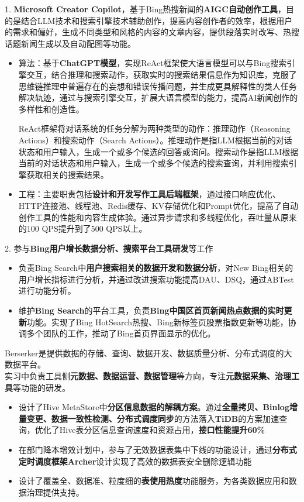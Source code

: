 \documentclass{resume}
\begin{document}
  1. \textbf{Microsoft Creator Copilot}，基于Bing热搜新闻的\textbf{AIGC自动创作工具}，目的是结合LLM技术和搜索引擎技术辅助创作，提高内容创作者的效率，根据用户的需求和偏好，生成不同类型和风格的内容的文章内容，提供段落实时改写、热搜话题新闻生成以及自动配图等功能。
  \begin{itemize}
    \item 算法：基于\textbf{ChatGPT模型}，实现ReAct框架使大语言模型可以与Bing搜索引擎交互，结合推理和搜索动作，获取实时的搜索结果信息作为知识库，克服了思维链推理中普遍存在的妄想和错误传播问题，并生成更具解释性的类人任务解决轨迹，通过与搜索引擎交互，扩展大语言模型的能力，提高AI新闻创作的多样性和创造性。
    
    ReAct框架将对话系统的任务分解为两种类型的动作：推理动作（Reasoning Actions）和搜索动作（Search Actions）。推理动作是指LLM根据当前的对话状态和用户输入，生成一个或多个候选的回答或询问。搜索动作是指LLM根据当前的对话状态和用户输入，生成一个或多个候选的搜索查询，并利用搜索引擎获取相关的搜索结果。
    \item 工程：主要职责包括\textbf{设计和开发写作工具后端框架}，通过接口响应优化、HTTP连接池、线程池、Redis缓存、KV存储优化和Prompt优化，提高了自动创作工具的性能和内容生成体验。通过异步请求和多线程优化，吞吐量从原来的100 QPS提升到了500 QPS以上。
  \end{itemize}
  2. 参与\textbf{Bing用户增长数据分析、搜索平台工具研发}等工作
  \begin{itemize}
    \item 负责Bing Search中\textbf{用户搜索相关的数据开发和数据分析}，对New Bing相关的用户增长指标进行分析，并通过改进搜索功能提高DAU、DSQ，通过ABTest进行功能分析。
    \item 维护\textbf{Bing Search}的平台工具，负责\textbf{Bing中国区首页新闻热点数据的实时更新}功能。实现了Bing HotSearch热搜、Bing新标签页股票指数更新等功能，协调多个团队的工作，推动了Bing首页界面显示的优化。
  \end{itemize}
  
  Berserker是提供数据的存储、查询、数据开发、数据质量分析、分布式调度的大数据平台。\\
  实习中负责工具侧\textbf{元数据、数据运营、数据管理}等方向，专注\textbf{元数据采集、治理工具}等功能的研发。
  \begin{itemize}
    \item 设计了Hive MetaStore中\textbf{分区信息数据的解耦方案}。通过\textbf{全量拷贝、Binlog增量变更、数据一致性检测、分布式调度同步}的方法落入\textbf{TiDB}的方案加速查询，优化了Hive表分区信息查询速度和资源占用，\textbf{接口性能提升60\%}
    \item 在部门降本增效计划中，参与了无效数据表集中下线的功能设计，通过\textbf{分布式定时调度框架Archer}设计实现了高效的数据表安全删除逻辑功能
    \item 设计了覆盖全、数据准、粒度细的\textbf{表使用热度}功能服务，为各类数据应用和数据治理提供支持。
  \end{itemize}
\end{document}
